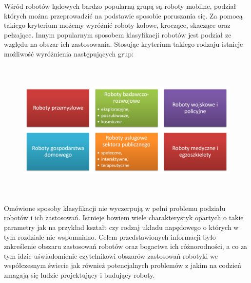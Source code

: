 Wśród robotów lądowych bardzo popularną grupą są roboty mobilne, podział których
można przeprowadzić na podstawie sposobie poruszania się. Za pomocą takiego
kryterium możemy wyróżnić roboty kołowe, kroczące, skaczące oraz pełzające.
Innym popularnym sposobem klasyfikacji robotów jest podział ze względu na 
obszar ich zastosowania. Stosując kryterium takiego rodzaju istnieje możliwość
wyróżnienia następujących grup:
\begin{figure}[hb]
 \centering
 \includegraphics[height=70mm]{../images/ch01/robot_types.png}
 \label{fig:RobotsGenerations}
\end{figure}

Omówione sposoby klasyfikacji nie wyczerpują w pełni problemu podziału
robotów i ich zastosowań. Istnieje bowiem wiele charakterystyk opartych o takie
parametry jak na przykład kształt czy rodzaj układu napędowego o których w tym
rozdziale nie wspomniano. Celem przedstawionych informacji było zakreślenie
obszaru zastosowań robotów oraz bogactwa ich różnorodności, a co za tym idzie
uświadomienie czytelnikowi obszarów zastosowań robotyki we współczesnym świecie
jak również potencjalnych problemów z jakim na codzień zmagają się ludzie
projektujący i budujący roboty.
